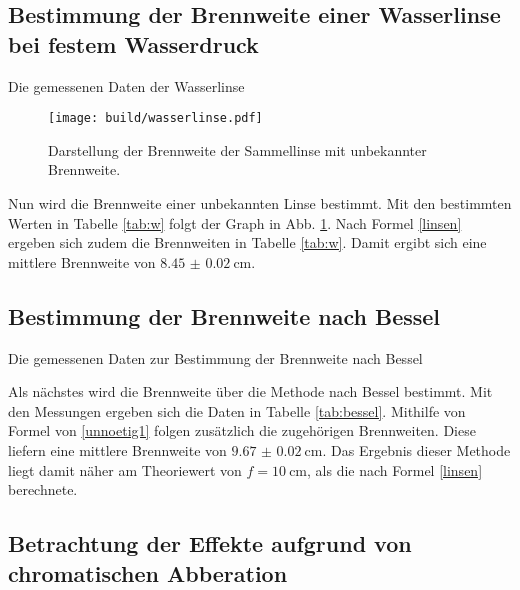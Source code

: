 \subsection{Bestimmung der Brennweite einer Wasserlinse bei festem Wasserdruck}

\begin{table}
	\centering
	\caption{Die gemessenen Daten der Wasserlinse}
	
	\label{tab:w}
\end{table}

\begin{figure}
 \centering
 \texttt{[image: build/wasserlinse.pdf]}
 \caption{Darstellung der Brennweite der Sammellinse mit unbekannter Brennweite.}
 \label{fig:water}
\end{figure}

Nun wird die Brennweite einer unbekannten Linse bestimmt. Mit den bestimmten Werten in Tabelle \ref{tab:w} folgt der Graph in Abb. \ref{fig:water}. Nach Formel \eqref{linsen} ergeben sich zudem die Brennweiten in Tabelle \ref{tab:w}. Damit ergibt sich eine mittlere Brennweite von $\SI{8.45(2)}{\centi\meter}$.



\subsection{Bestimmung der Brennweite nach Bessel}

\begin{table}
	\centering
	\caption{Die gemessenen Daten zur Bestimmung der Brennweite nach Bessel}
	
	\label{tab:bessel}
\end{table}



 Als nächstes wird die Brennweite über die Methode nach Bessel bestimmt. Mit den Messungen ergeben sich die Daten in Tabelle \ref{tab:bessel}. Mithilfe von Formel von \eqref{unnoetig1} folgen zusätzlich die zugehörigen Brennweiten. Diese liefern eine mittlere Brennweite von $\SI{9.67(2)}{\centi\meter}$. Das Ergebnis dieser Methode liegt damit näher am Theoriewert von $f = \SI{10}{\centi\meter}$, als die nach Formel \eqref{linsen} berechnete.

 \subsection{Betrachtung der Effekte aufgrund von chromatischen Abberation}

